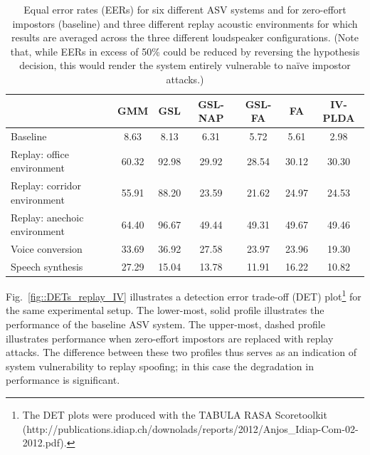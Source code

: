 \begin{table}
\renewcommand{\arraystretch}{1.2}
\begin{center}
    \begin{tabular}{ l  c c c c c c}
    \hline
 &  GMM & GSL & GSL-NAP  & GSL-FA & FA & IV-PLDA \\ 
 \hline \hline
Baseline & 8.63 & 8.13 & 6.31 & 5.72 & 5.61 & 2.98\\
\hline
Replay: office environment & 60.32 & 92.98 & 29.92 & 28.54 & 30.12 & 30.30\\
Replay: corridor environment & 55.91 & 88.20 & 23.59 & 21.62 & 24.97 & 24.53\\
Replay: anechoic environment & 64.40 & 96.67 & 49.44 & 49.31 & 49.67 & 49.46\\
\hline
Voice conversion & 33.69 & 36.92 & 27.58 & 23.97 & 23.96 & 19.30\\
Speech synthesis & 27.29 & 15.04 & 13.78 & 11.91 & 16.22 & 10.82\\
\hline
    \end{tabular}
    \caption{Equal error rates (EERs) for six different ASV systems and for zero-effort impostors (baseline) and three different replay acoustic environments for which results are averaged across the three different loudspeaker configurations.  (Note that, while EERs in excess of 50\% could be reduced by reversing the hypothesis decision, this would render the system entirely vulnerable to na{\"{i}}ve impostor attacks.)}
		\label{tab::results_EER}
   \end{center}
\end{table}







Fig.~\ref{fig::DETs_replay_IV} illustrates a detection error trade-off (DET) plot\footnote{The DET plots were produced with the TABULA RASA Scoretoolkit (http://publications.idiap.ch/downolads/reports/2012/Anjos\_Idiap-Com-02-2012.pdf).} for the same experimental setup.  The lower-most, solid profile illustrates the performance of the baseline ASV system.  The upper-most, dashed profile illustrates performance when zero-effort impostors are replaced with replay attacks.  The difference between these two profiles thus serves as an indication of system vulnerability to replay spoofing; in this case the degradation in performance is significant.  



